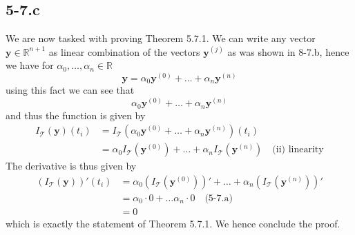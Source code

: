 \documentclass{article}
\begin{document}
\subsection*{5-7.c}
We are now tasked with proving Theorem 5.7.1. We can write any vector $\mathbf{y}\in \mathbb{R}^{n+1}$ as linear combination of the vectors $\mathbf{y}^{\left(j\right)}$ as was shown in 8-7.b, hence we have for $\alpha_{0}, \dots, \alpha_{n} \in \mathbb{R}$
\begin{equation*}
    \mathbf{y} = \alpha_{0}\mathbf{y}^{\left(0\right)} + \dots + \alpha_{n}\mathbf{y}^{\left(n\right)}
\end{equation*}
using this fact we can see that 
\begin{equation*}
    \alpha_{0}\mathbf{y}^{\left(0\right)} + \dots + \alpha_{n}\mathbf{y}^{\left(n\right)}
\end{equation*}
and thus the function is given by
\begin{align*}
    I_{\mathcal{T}}\left(\mathbf{y}\right)\left(t_{i}\right) &= I_{\mathcal{T}}\left(\alpha_{0}\mathbf{y}^{\left(0\right)} + \dots + \alpha_{n}\mathbf{y}^{\left(n\right)}\right)\left(t_{i}\right) \\
    &=\alpha_{0}I_{\mathcal{T}}\left(\mathbf{y}^{\left(0\right)}\right) + \dots + \alpha_{n}I_{\mathcal{T}}\left(\mathbf{y}^{\left(n\right)}\right) \quad \text{(ii) linearity}
\end{align*}
The derivative is thus given by
\begin{align*}
   \left(I_{\mathcal{T}}\left(\mathbf{y}\right)\right)'\left(t_{i}\right) &= \alpha_{0}\left(I_{\mathcal{T}}\left(\mathbf{y}^{\left(0\right)}\right)\right)' + \dots + \alpha_{n}\left(I_{\mathcal{T}}\left(\mathbf{y}^{\left(n\right)}\right)\right)' \\
   &= \alpha_{0} \cdot 0 + \dots \alpha_{n} \cdot 0 \quad \text{(5-7.a)}\\
   &= 0
\end{align*}
which is exactly the statement of Theorem 5.7.1. We hence conclude the proof.
\end{document}
